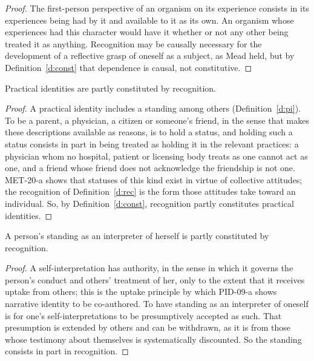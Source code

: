 \documentclass{situationist-preprint}
\begin{document}
\begin{proof}
The first-person perspective of an organism on its experience consists in its experiences being had by it and available to it as its own. An organism whose experiences had this character would have it whether or not any other being treated it as anything. Recognition may be causally necessary for the development of a reflective grasp of oneself as a subject, as Mead held, but by Definition~\ref{d:const} that dependence is causal, not constitutive.
\end{proof}

\begin{lemma}\label{l:pi}
Practical identities are partly constituted by recognition.
\end{lemma}

\begin{proof}
A practical identity includes a standing among others (Definition~\ref{d:pi}). To be a parent, a physician, a citizen or someone's friend, in the sense that makes these descriptions available as reasons, is to hold a status, and holding such a status consists in part in being treated as holding it in the relevant practices: a physician whom no hospital, patient or licensing body treats as one cannot act as one, and a friend whose friend does not acknowledge the friendship is not one. MET-20-a shows that statuses of this kind exist in virtue of collective attitudes; the recognition of Definition~\ref{d:rec} is the form those attitudes take toward an individual. So, by Definition~\ref{d:const}, recognition partly constitutes practical identities.
\end{proof}

\begin{lemma}\label{l:standing}
A person's standing as an interpreter of herself is partly constituted by recognition.
\end{lemma}

\begin{proof}
A self-interpretation has authority, in the sense in which it governs the person's conduct and others' treatment of her, only to the extent that it receives uptake from others; this is the uptake principle by which PID-09-a shows narrative identity to be co-authored. To have standing as an interpreter of oneself is for one's self-interpretations to be presumptively accepted as such. That presumption is extended by others and can be withdrawn, as it is from those whose testimony about themselves is systematically discounted. So the standing consists in part in recognition.
\end{proof}
\end{document}
